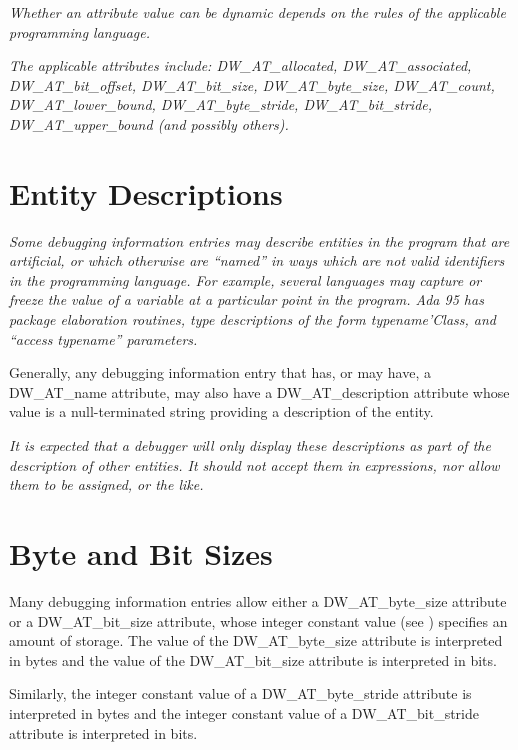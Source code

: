 \textit{
Whether an attribute value can be dynamic depends on the
rules of the applicable programming language.
}

\textit{The applicable attributes include: 
DW\-\_AT\-\_allocated,
DW\-\_AT\-\_associated, 
DW\-\_AT\-\_bit\-\_offset, 
DW\-\_AT\-\_bit\-\_size,
DW\-\_AT\-\_byte\-\_size, 
DW\-\_AT\-\_count, 
DW\-\_AT\-\_lower\-\_bound,
DW\-\_AT\-\_byte\-\_stride, 
DW\-\_AT\-\_bit\-\_stride, 
DW\-\_AT\-\_upper\-\_bound (and
possibly others).}


\section{Entity Descriptions}
\textit{Some debugging information entries may describe entities
in the program that are artificial, or which otherwise are
``named'' in ways which are not valid identifiers in the
programming language. For example, several languages may
capture or freeze the value of a variable at a particular
point in the program. Ada 95 has package elaboration routines,
type descriptions of the form typename’Class, and 
``access typename'' parameters.  }

Generally, any debugging information
entry that has, or may have, a DW\-\_AT\-\_name attribute, may
also have a DW\-\_AT\-\_description attribute whose value is a
null-terminated string providing a description of the entity.


\textit{It is expected that a debugger will only display these
descriptions as part of the description of other entities. It
should not accept them in expressions, nor allow them to be
assigned, or the like.}

\section{Byte and Bit Sizes}
\label{chap:byteandbitsizes}
Many debugging information entries allow either a
DW\-\_AT\-\_byte\-\_size attribute or a DW\-\_AT\-\_bit\-\_size attribute,
whose integer constant value 
(see ) 
specifies an
amount of storage. The value of the DW\-\_AT\-\_byte\-\_size attribute
is interpreted in bytes and the value of the DW\-\_AT\-\_bit\-\_size
attribute is interpreted in bits.  

Similarly, the integer
constant value of a DW\-\_AT\-\_byte\-\_stride attribute is interpreted
in bytes and the integer constant value of a DW\-\_AT\-\_bit\-\_stride
attribute is interpreted in bits.

